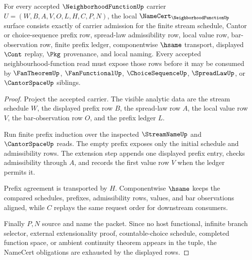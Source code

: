 \begin{theorem}
\label{thm:neighborhood-function-namecert-obligations}
For every accepted $\NeighborhoodFunctionUp$ carrier $U=(W,B,A,V,O,L,H,C,P,N)$, the local $\NameCert_{\NeighborhoodFunctionUp}$ surface consists exactly of carrier admission for the finite stream schedule, Cantor or choice-sequence prefix row, spread-law admissibility row, local value row, bar-observation row, finite prefix ledger, componentwise $\hsame$ transport, displayed $\Cont$ replay, $\Pkg$ provenance, and local naming. Every accepted neighbourhood-function read must expose those rows before it may be consumed by $\FanTheoremUp$, $\FanFunctionalUp$, $\ChoiceSequenceUp$, $\SpreadLawUp$, or $\CantorSpaceUp$ siblings.
\end{theorem}
\begin{proof}
Project the accepted carrier. The visible analytic data are the stream schedule $W$, the displayed prefix row $B$, the spread-law row $A$, the local value row $V$, the bar-observation row $O$, and the prefix ledger $L$.

Run finite prefix induction over the inspected $\StreamNameUp$ and $\CantorSpaceUp$ reads. The empty prefix exposes only the initial schedule and admissibility rows. The extension step appends one displayed prefix entry, checks admissibility through $A$, and records the first value row $V$ when the ledger permits it.

Prefix agreement is transported by $H$. Componentwise $\hsame$ keeps the compared schedules, prefixes, admissibility rows, values, and bar observations aligned, while $C$ replays the same request order for downstream consumers.

Finally $P,N$ source and name the packet. Since no host functional, infinite branch selector, external extensionality proof, countable-choice schedule, completed function space, or ambient continuity theorem appears in the tuple, the NameCert obligations are exhausted by the displayed rows.
\end{proof}

